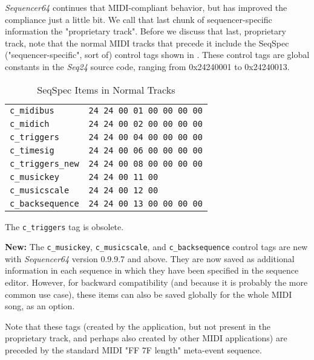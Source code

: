    \textsl{Sequencer64} continues that MIDI-compliant behavior, but has
   improved the compliance just a little bit. 
   We call that last chunk of sequencer-specific information the "proprietary
   track".
   Before we discuss that last, proprietary track, note that the normal MIDI
   tracks that
   precede it include the SeqSpec ("sequencer-specific", sort of)
   control tags shown in .
   These control tags are global constants in the \textsl{Seq24} source
   code, ranging from 0x24240001 to 0x24240013.

   \begin{table}[htb]
      \centering
      \caption{SeqSpec Items in Normal Tracks}
      \label{table:seqspec_items_normal_tracks}
      \begin{tabular}{l l}
         \texttt{c\_midibus}        & \texttt{24 24 00 01 00 00 00 00} \\
         \texttt{c\_midich}         & \texttt{24 24 00 02 00 00 00 00} \\
         \texttt{c\_triggers}       & \texttt{24 24 00 04 00 00 00 00} \\
         \texttt{c\_timesig}        & \texttt{24 24 00 06 00 00 00 00} \\
         \texttt{c\_triggers\_new}  & \texttt{24 24 00 08 00 00 00 00} \\
         \texttt{c\_musickey}       & \texttt{24 24 00 11 00} \\
         \texttt{c\_musicscale}     & \texttt{24 24 00 12 00} \\
         \texttt{c\_backsequence}   & \texttt{24 24 00 13 00 00 00 00} \\
      \end{tabular}
   \end{table}

   The \texttt{c\_triggers} tag is obsolete.

   \textbf{New:}
   The \texttt{c\_musickey},
   \texttt{c\_musicscale}, and
   \texttt{c\_backsequence}
   control tags are new with \textsl{Sequencer64} version 0.9.9.7 and above.
   They are now saved as additional information in each sequence in which they
   have been specified in the sequence editor.
   However, for backward compatibility (and because it is probably the more
   common use case), these items can also be
   saved globally for the whole MIDI song, as an option.

   Note that these tags (created by the application, but not present in the
   proprietary track, and perhaps also created by other MIDI applications) are
   preceded by the standard MIDI "FF 7F length" meta-event sequence.

